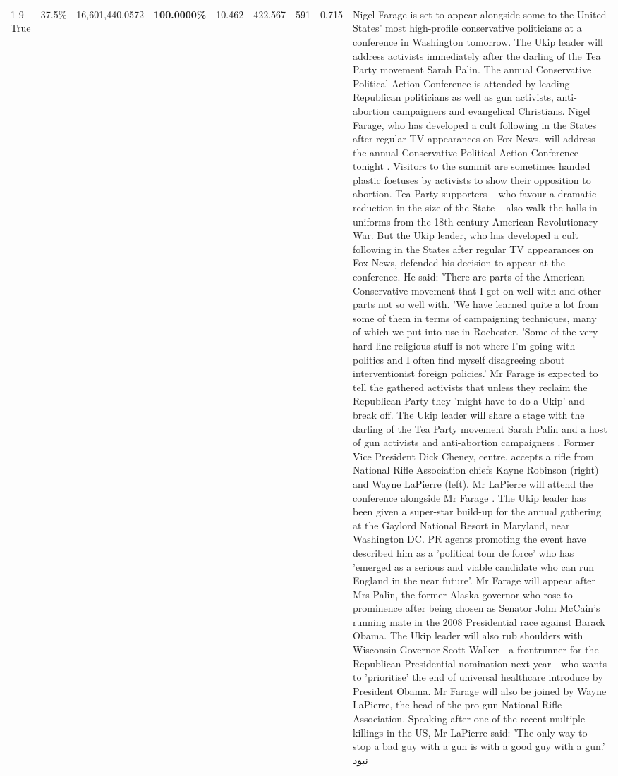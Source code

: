 \begin{table}[H]
\begin{tabular}{lllrlllll}
\cline{1-9}
True & 37.5\% & 16,601,440.0572 & \bfseries \color{red} 100.0000\% & 10.462 & 422.567 & 591 & 0.715 & Nigel Farage is set to appear alongside some to the United States' most high-profile conservative politicians at a conference in Washington tomorrow. The Ukip leader will address activists immediately after the darling of the Tea Party movement Sarah Palin. The annual Conservative Political Action Conference is attended by leading Republican politicians as well as gun activists, anti-abortion campaigners and evangelical Christians. Nigel Farage, who has developed a cult following in the States after regular TV appearances on Fox News, will address the annual Conservative Political Action Conference tonight . Visitors to the summit are sometimes handed plastic foetuses by activists to show their opposition to abortion. Tea Party supporters – who favour a dramatic reduction in the size of the State – also walk the halls in uniforms from the 18th-century American Revolutionary War. But the Ukip leader, who has developed a cult following in the States after regular TV appearances on Fox News, defended his decision to appear at the conference. He said: 'There are parts of the American Conservative movement that I get on well with and other parts not so well with. 'We have learned quite a lot from some of them in terms of campaigning techniques, many of which we put into use in Rochester. 'Some of the very hard-line religious stuff is not where I'm going with politics and I often find myself disagreeing about interventionist foreign policies.' Mr Farage is expected to tell the gathered activists that unless they reclaim the Republican Party they 'might have to do a Ukip' and break off. The Ukip leader will share a stage with the darling of the Tea Party movement Sarah Palin and a host of gun activists and anti-abortion campaigners . Former Vice President Dick Cheney, centre, accepts a rifle from National Rifle Association chiefs Kayne Robinson (right) and Wayne LaPierre (left). Mr LaPierre will attend the conference alongside Mr Farage . The Ukip leader has been given a super-star build-up for the annual gathering at the Gaylord National Resort in Maryland, near Washington DC. PR agents promoting the event have described him as a 'political tour de force' who has 'emerged as a serious and viable candidate who can run England in the near future'. Mr Farage will appear after Mrs Palin, the former Alaska governor who rose to prominence after being chosen as Senator John McCain's running mate in the 2008 Presidential race against Barack Obama. The Ukip leader will also rub shoulders with Wisconsin Governor Scott Walker - a frontrunner for the Republican Presidential nomination next year - who wants to 'prioritise' the end of universal healthcare introduce by President Obama. Mr Farage will also be joined by Wayne LaPierre, the head of the pro-gun National Rifle Association. Speaking after one of the recent multiple killings in the US, Mr LaPierre said: 'The only way to stop a bad guy with a gun is with a good guy with a gun.' نبود \\

\end{tabular}
\end{table}

